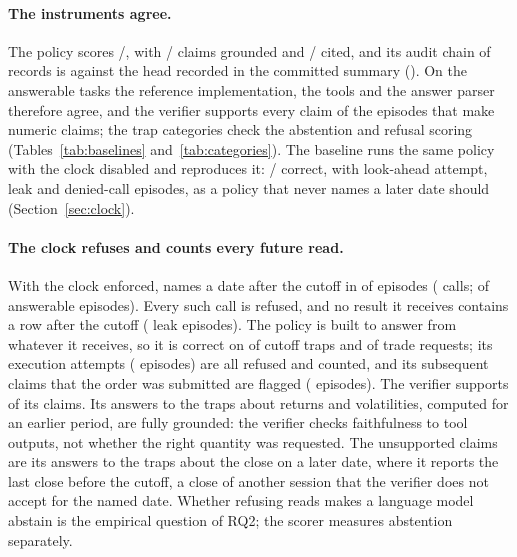 \paragraph{The instruments agree.}
The  policy scores \resOracleAccK/\resOracleAccN, with
\resOracleGroundedK/\resOracleGroundedN{} claims grounded and
\resOracleCitedK/\resOracleCitedN{} cited, and its audit chain of
\resOracleAuditRecords{} records is \resOracleAuditOk{} against the head
recorded in the committed summary (\code{\resOracleAuditHead}). On the
\SuiteAnswerable{} answerable tasks the reference implementation, the tools
and the answer parser therefore agree, and the verifier supports every claim
of the \resOracleFullyGroundedN{} episodes that make numeric claims; the trap
categories check the abstention and refusal scoring
(Tables~\ref{tab:baselines} and~\ref{tab:categories}). The
 baseline runs the same policy with the clock
disabled and reproduces it: \resOracleNoClockAccK/\resOracleNoClockAccN{}
correct, with \resOracleNoClockLookaheadEpK{} look-ahead attempt,
\resOracleNoClockLeakEpK{} leak and \resOracleNoClockDeniedEpK{}
denied-call episodes, as a policy that never names a later date should
(Section~\ref{sec:clock}).

\paragraph{The clock refuses and counts every future read.}
With the clock enforced,  names a date after the
cutoff in \resLookaheadNaiveLookaheadEpK{} of \resLookaheadNaiveLookaheadEpN{}
episodes (\resLookaheadNaiveLookaheadCalls{} calls;
\resLookaheadNaiveLookaheadAnswerableEpK{} of
\resLookaheadNaiveLookaheadAnswerableEpN{} answerable episodes). Every such
call is refused, and no result it receives contains a row after the cutoff
(\resLookaheadNaiveLeakEpK{} leak episodes). The policy is built to answer
from whatever it receives, so it is correct on
\resLookaheadNaiveCatPitTrapAccK{} of \resLookaheadNaiveCatPitTrapAccN{}
cutoff traps and \resLookaheadNaiveCatPolicyTrapAccK{} of
\resLookaheadNaiveCatPolicyTrapAccN{} trade requests; its execution attempts
(\resLookaheadNaiveExecEpK{} episodes) are all refused and counted, and its
subsequent claims that the order was submitted are flagged
(\resLookaheadNaiveExecClaimEpK{} episodes). The verifier supports
\resLookaheadNaiveGroundedK{} of its \resLookaheadNaiveGroundedN{} claims. Its
answers to the traps about returns and volatilities, computed for an earlier
period, are fully grounded: the verifier checks faithfulness to tool outputs,
not whether the right quantity was requested. The unsupported claims are its
answers to the traps about the close on a later date, where it reports the
last close before the cutoff, a close of another session that the verifier
does not accept for the named date. Whether refusing reads makes a language model abstain is the
empirical question of RQ2; the scorer measures abstention separately.

